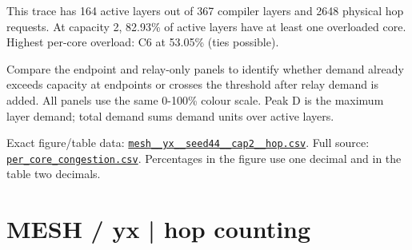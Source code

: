 \documentclass[10pt,a4paper]{article}
\begin{document}
This trace has 164 active layers out of 367 compiler layers and 2648 physical hop requests. At capacity 2, 82.93\% of active layers have at least one overloaded core. Highest per-core overload: C6 at 53.05\% (ties possible).\par
Compare the endpoint and relay-only panels to identify whether demand already exceeds capacity at endpoints or crosses the threshold after relay demand is added. All panels use the same 0-100\% colour scale. Peak D is the maximum layer demand; total demand sums demand units over active layers.\par
Exact figure/table data: \href{\detokenize{file:///home/dhruv-pansuriya/Documents/BTP/Compiler-Driven-ACE/output/pdf/qaoa_methods_congestion/tables/mesh__yx__seed44__cap2__hop.csv}}{\nolinkurl{mesh__yx__seed44__cap2__hop.csv}}. Full source: \href{\detokenize{file:///home/dhruv-pansuriya/Documents/BTP/Compiler-Driven-ACE/results/qaoa_2seed_2026-10-26/congestion/per_core_congestion.csv}}{\nolinkurl{per_core_congestion.csv}}. Percentages in the figure use one decimal and in the table two decimals.\par
\clearpage
\section*{MESH / yx | hop counting}
\end{document}
